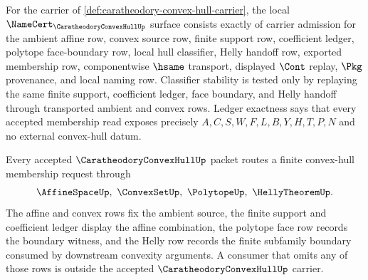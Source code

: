 \begin{theorem}
\label{thm:caratheodory-convex-hull-namecert-obligations}
For the carrier of \autoref{def:caratheodory-convex-hull-carrier}, the local $\NameCert_{\CaratheodoryConvexHullUp}$ surface consists exactly of carrier admission for the ambient affine row, convex source row, finite support row, coefficient ledger, polytope face-boundary row, local hull classifier, Helly handoff row, exported membership row, componentwise $\hsame$ transport, displayed $\Cont$ replay, $\Pkg$ provenance, and local naming row. Classifier stability is tested only by replaying the same finite support, coefficient ledger, face boundary, and Helly handoff through transported ambient and convex rows. Ledger exactness says that every accepted membership read exposes precisely $A,C,S,W,F,L,B,Y,H,T,P,N$ and no external convex-hull datum.
\end{theorem}

\begin{theorem}
\label{thm:caratheodory-convex-hull-helly-handoff}
Every accepted $\CaratheodoryConvexHullUp$ packet routes a finite convex-hull membership request through
$$
\AffineSpaceUp,\ \ConvexSetUp,\ \PolytopeUp,\ \HellyTheoremUp .
$$
The affine and convex rows fix the ambient source, the finite support and coefficient ledger display the affine combination, the polytope face row records the boundary witness, and the Helly row records the finite subfamily boundary consumed by downstream convexity arguments. A consumer that omits any of those rows is outside the accepted $\CaratheodoryConvexHullUp$ carrier.
\end{theorem}


\begin{closurestatus}{\CaratheodoryConvexHullUp}
  \theoryclosure{\seedClosure}
  \formalstatus{\unformalizedV}
\end{closurestatus}
